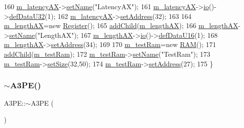 \begin{DoxyCode}
160     \hyperlink{classA3PE_a061472eb539bb6ac99f4fa11a760eeaf}{m\_latencyAX}->\hyperlink{classObject_ae30fea75683c2d149b6b6d17c09ecd0c}{setName}(\textcolor{stringliteral}{"LatencyAX"});
161     \hyperlink{classA3PE_a061472eb539bb6ac99f4fa11a760eeaf}{m\_latencyAX}->\hyperlink{classIOobject_af04fb94137c3d86849f478ac5afab5d1}{io}()->\hyperlink{classIOdata_a78e50aa4a6c967cba195e77fe911a8c3}{defDataU32}(1);
162     \hyperlink{classA3PE_a061472eb539bb6ac99f4fa11a760eeaf}{m\_latencyAX}->\hyperlink{classIOobject_ae0d372aaeafe3da3c239677118deb2ac}{setAddress}(32);
163 
164     \hyperlink{classA3PE_a87c93a38343873f2d52741deca4750ce}{m\_lengthAX}=\textcolor{keyword}{new} \hyperlink{classRegister}{Register}();
165     \hyperlink{classHierarchy_ad677774ff38fcb257c04a3a10d471fac}{addChild}(\hyperlink{classA3PE_a87c93a38343873f2d52741deca4750ce}{m\_lengthAX});
166     \hyperlink{classA3PE_a87c93a38343873f2d52741deca4750ce}{m\_lengthAX}->\hyperlink{classObject_ae30fea75683c2d149b6b6d17c09ecd0c}{setName}(\textcolor{stringliteral}{"LengthAX"});
167     \hyperlink{classA3PE_a87c93a38343873f2d52741deca4750ce}{m\_lengthAX}->\hyperlink{classIOobject_af04fb94137c3d86849f478ac5afab5d1}{io}()->\hyperlink{classIOdata_a9e37c736d6dfb5223ed45786fad403da}{defDataU16}(1);
168     \hyperlink{classA3PE_a87c93a38343873f2d52741deca4750ce}{m\_lengthAX}->\hyperlink{classIOobject_ae0d372aaeafe3da3c239677118deb2ac}{setAddress}(34);
169 
170     \hyperlink{classA3PE_ad788e41ef5c674ab1a7671f3db0ffef6}{m\_testRam}=\textcolor{keyword}{new} \hyperlink{classRAM}{RAM}();
171     \hyperlink{classHierarchy_ad677774ff38fcb257c04a3a10d471fac}{addChild}(\hyperlink{classA3PE_ad788e41ef5c674ab1a7671f3db0ffef6}{m\_testRam});
172     \hyperlink{classA3PE_ad788e41ef5c674ab1a7671f3db0ffef6}{m\_testRam}->\hyperlink{classObject_ae30fea75683c2d149b6b6d17c09ecd0c}{setName}(\textcolor{stringliteral}{"TestRam"});
173     \hyperlink{classA3PE_ad788e41ef5c674ab1a7671f3db0ffef6}{m\_testRam}->\hyperlink{classRAM_adcf2ebb12f1a3e833ce7d5a33670c29d}{setSize}(32,50);
174     \hyperlink{classA3PE_ad788e41ef5c674ab1a7671f3db0ffef6}{m\_testRam}->\hyperlink{classIOobject_ae0d372aaeafe3da3c239677118deb2ac}{setAddress}(27);
175   \}
\end{DoxyCode}
\mbox{\label{classA3PE_aab155e065b455ff439daf47a976399c3}} 
\subsubsection{\texorpdfstring{$\sim$\+A3\+P\+E()}{~A3PE()}}
{\footnotesize\ttfamily A3\+P\+E\+::$\sim$\+A3\+PE (\begin{DoxyParamCaption}{ }\end{DoxyParamCaption})\hspace{0.3cm}{\ttfamily [inline]}}




